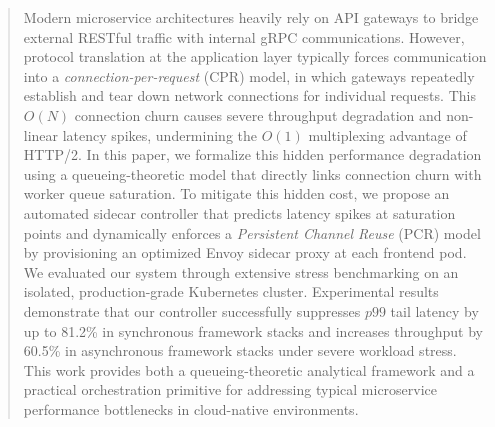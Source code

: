 \documentclass{ieeeaccess}
\begin{document}
	
	\begin{abstract} 
		Modern microservice architectures heavily rely on API gateways to bridge external RESTful traffic with internal gRPC communications. However, protocol translation at the application layer typically forces communication into a \textit{connection-per-request} (CPR) model, in which gateways repeatedly establish and tear down network connections for individual requests. This $O(N)$ connection churn causes severe throughput degradation and non-linear latency spikes, undermining the $O(1)$ multiplexing advantage of HTTP/2. In this paper, we formalize this hidden performance degradation using a queueing-theoretic model that directly links connection churn with worker queue saturation. To mitigate this hidden cost, we propose an automated sidecar controller that predicts latency spikes at saturation points and dynamically enforces a \textit{Persistent Channel Reuse} (PCR) model by provisioning an optimized Envoy sidecar proxy at each frontend pod. We evaluated our system through extensive stress benchmarking on an isolated, production-grade Kubernetes cluster. Experimental results demonstrate that our controller successfully suppresses $p99$ tail latency by up to 81.2\% in synchronous framework stacks and increases throughput by 60.5\% in asynchronous framework stacks under severe workload stress. This work provides both a queueing-theoretic analytical framework and a practical orchestration primitive for addressing typical microservice performance bottlenecks in cloud-native environments.
	\end{abstract}
	
\end{document}

